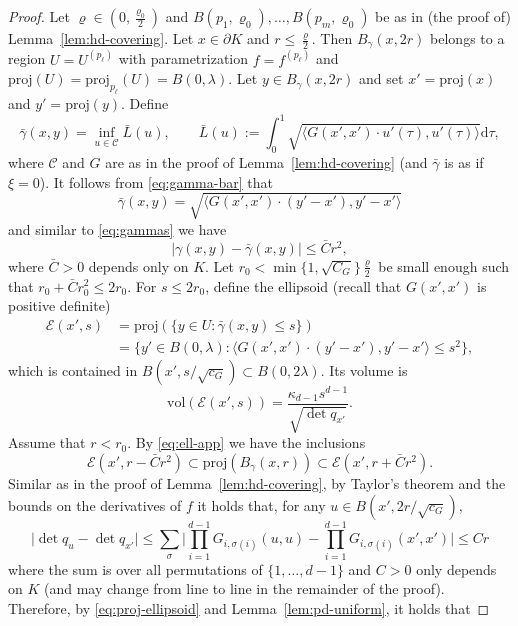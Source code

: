 \documentclass[a4paper,12pt,reqno]{amsart}
\theoremstyle{definition}
\newcommand{\vol}{\mathrm{vol}}
\newcommand{\proj}{\mathrm{proj}}
\newcommand{\curv}{\mathcal{C}}
\newcommand{\dd}{\mathrm{d}}
\begin{document}
\begin{proof}
	Let $\varrho\in (0,\frac{\varrho_0}{2})$ and $B(p_1,\varrho_0),\dots,B(p_m,\varrho_0)$ be as in (the proof of) Lemma~\ref{lem:hd-covering}. Let $x\in \partial K$ and $r\le \frac{\varrho}{2}$. Then $B_{\gamma}(x,2r)$ belongs to a region $U=U^{(p_{\ell})}$ with parametrization $f=f^{(p_{\ell})}$ and $\proj(U)=\proj_{p_{\ell}}(U)= B(0,\lambda)$. Let $y\in B_{\gamma}(x,2r)$ and set $x'=\proj(x)$ and $y'=\proj(y)$. Define 
\begin{equation} \label{eq:geo-bar-0}
\bar{\gamma}(x,y)
=\inf_{u\in \curv} \bar{L}(u),
\qquad
\bar{L}(u):=\int_0^1 \sqrt{\langle G(x',x')\cdot u'(\tau),u'(\tau)\rangle} \dd \tau,
\end{equation}
where $\curv$ and $G$ are as in the proof of Lemma~\ref{lem:hd-covering} (and $\bar{\gamma}$ is as if $\xi=0$). It follows from  \eqref{eq:gamma-bar} that
\[
\bar{\gamma}(x,y)
=\sqrt{\langle G(x',x')\cdot (y'-x'),y'-x'\rangle}
\]
and similar to \eqref{eq:gammas} we have
\begin{equation} \label{eq:ell-app}
	|\gamma(x,y)-\bar{\gamma}(x,y)|\le \bar{C} r^2,
\end{equation}
where $\bar{C}>0$ depends only on $K$. Let $r_0<\min\{1,\sqrt{C_G}\}\frac{\varrho}{2}$ be small enough such that $r_0+\bar{C}r_0^2\le 2r_0$.  For $s\le 2r_0$, define the ellipsoid (recall that $G(x',x')$ is positive definite)
\begin{align*}
	\mathcal{E}(x',s)
&=\proj(\{y\in U\colon \bar{\gamma}(x,y)\le s\})\\
&=\{y'\in B(0,\lambda)\colon \langle G(x',x')\cdot (y'-x'),y'-x'\rangle \le s^2\},
\end{align*}
which is contained in $B(x',s/\sqrt{c_G})\subset B(0,2\lambda)$. Its volume is
\[
\vol(\mathcal{E}(x',s))=\frac{\kappa_{d-1}s^{d-1}}{\sqrt{\det q_{x'}}}.
\]
Assume that $r<r_0$. By \eqref{eq:ell-app} we have the inclusions 
\begin{equation} \label{eq:proj-ellipsoid}
	\mathcal{E}(x',r-\bar{C}r^2) \subset \proj(B_{\gamma}(x,r)) \subset \mathcal{E}(x',r+\bar{C}r^2).
\end{equation}
Similar as in the proof of Lemma~\ref{lem:hd-covering}, by Taylor's theorem and the bounds on the derivatives of $f$ it holds that, for any $u\in B(x',2r/\sqrt{c_G})$,
\[
\big|\det q_{u}-\det q_{x'}\big|
\le \sum_{\sigma}\Big|\prod_{i=1}^{d-1}G_{i,\sigma(i)}(u,u)-\prod_{i=1}^{d-1}G_{i,\sigma(i)}(x',x')\Big|
\le C r
\]
where the sum is over all permutations of $\{1,\dots,d-1\}$ and $C>0$ only depends on $K$ (and may change from line to line in the remainder of the proof). Therefore, by \eqref{eq:proj-ellipsoid} and Lemma~\ref{lem:pd-uniform}, it holds that

\end{proof}
\end{document}
